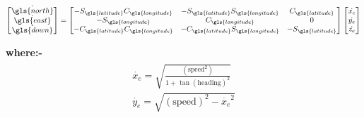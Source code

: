 \begin{equation}
	\begin{bmatrix}																
		\dot{\gls{north}  } \\
		\dot{\gls{east}}    \\
		\dot{\gls{down}}
	\end{bmatrix}
	=
	\begin{bmatrix}																
		-S_{\gls{latitude}}C_{\gls{longitude}} & -S_{\gls{latitude}}S_{\gls{longitude}} & C_{\gls{latitude}}  \\
		-S_{\gls{longitude}}                   & C_{\gls{longitude}}                    & 0                   \\
		-C_{\gls{latitude}}C_{\gls{longitude}} & -C_{\gls{latitude}}S_{\gls{longitude}} & -S_{\gls{latitude}}
	\end{bmatrix}
	\begin{bmatrix}																
		\dot{x_e} \\
		\dot{y_e} \\
		\dot{z_e}
	\end{bmatrix}
	\label{Eq: ecef frame mapping velocity1}
\end{equation}





{\bf where:-}
\begin{align}
	\begin{split}
		\dot{x_e} = \sqrt{\frac{(\mathrm{speed}^2)}{1 + \tan(\mathrm{heading})^2}}\\
		\dot{y_e} = \sqrt{(\mathrm{speed})^2 - \dot{x_e}^2}
	\end{split}
\end{align}

%

%


